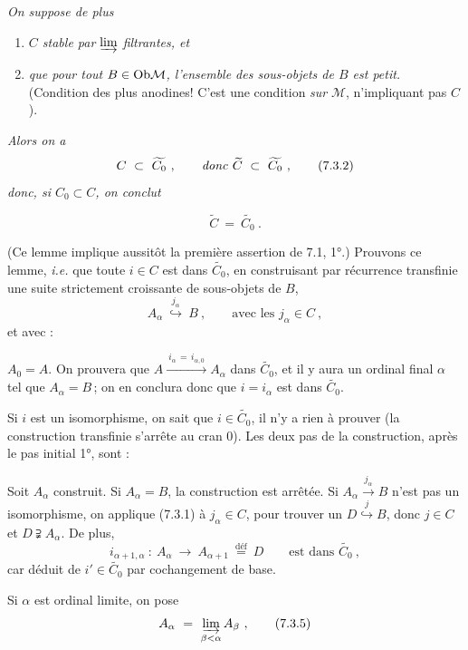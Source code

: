 \textit{On suppose de plus}
\begin{enumerate}[label={}]
\item[\cercle{c}] \textit{$C$ stable par} $\varinjlim$ \textit{filtrantes, et}
\item[\cercle{d}] \textit{que pour tout $B \in \mathrm{Ob} \mathcal{M}$, l'ensemble des sous-objets de $B$ est petit.} (Condition des plus anodines! C'est une condition \textit{sur} $\mathcal{M}$, n'impliquant pas $C$).
\end{enumerate}
\textit{Alors on a}
\[
C \ \subset \ \widetilde{C_0} \ , \qquad \text{\textit{donc} } \widetilde{C} \ \subset \ \widetilde{C_0} \ , \tag*{(7.3.2)}
\]
\textit{donc, si $C_0 \subset C$, on conclut}

\[
\widetilde{C} \ = \ \widetilde{C_0} \ . \tag*{(7.3.3)}
\]


(Ce lemme implique aussitôt la première assertion de 7.1, 1°.) Prouvons ce lemme, \textit{i.e.} que toute $i \in C$ est dans $\widetilde{C_0}$, en construisant par récurrence transfinie une suite strictement croissante de sous-objets de $B$,
\[
A_\alpha \ \overset{j_\alpha}{\hookrightarrow} \ B \ , \qquad \text{avec les } j_\alpha \in C \ ,
\]
et avec :

 $A_0 = A$. On prouvera que $A \xrightarrow{\ i_\alpha \,=\, i_{\alpha,0}\ } A_\alpha$ dans $\widetilde{C_0}$, et il y aura un ordinal final $\alpha$ tel que $A_\alpha = B$\,; on en conclura donc que $i = i_\alpha$ est dans $\widetilde{C_0}$.

Si $i$ est un isomorphisme, on sait que $i \in \widetilde{C_0}$, il n'y a rien à prouver (la construction transfinie s'arrête au cran 0). Les deux pas de la construction, après le pas initial 1°, sont :

 Soit $A_\alpha$ construit. Si $A_\alpha = B$, la construction est arrêtée. Si $A_\alpha \xrightarrow{j_\alpha} B$ n'est pas un isomorphisme, on applique (7.3.1) à $j_\alpha \in C$, pour trouver un $D \overset{j}{\hookrightarrow} B$, donc $j \in C$ et $D \supsetneqq A_\alpha$. De plus,
\[
i_{\alpha+1,\alpha} \ : \ A_\alpha \ \longrightarrow \ A_{\alpha+1} \ \overset{\text{déf}}{=} \ D \qquad \text{est dans } \widetilde{C_0} \ , \tag*{(7.3.4)}
\]
car déduit de $i' \in \widetilde{C_0}$ par cochangement de base.

 Si $\alpha$ est ordinal limite, on pose
\[
A_\alpha \ = \ \varinjlim_{\beta < \alpha} A_\beta \ , \tag*{(7.3.5)}
\]

